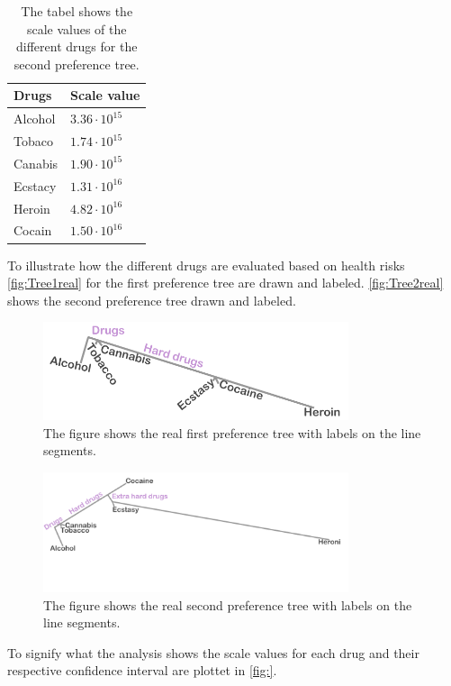 \begin{table}[H]
	\centering
	\begin{tabular}{@{}ll@{}}
		\toprule
		Drugs     & Scale value \\ \midrule
		Alcohol	  & $3.36\cdot10^{15}$   \\
		Tobaco	  & $1.74\cdot10^{15}$   \\
		Canabis	  & $1.90\cdot10^{15}$   \\
		Ecstacy	  & $1.31\cdot10^{16}$   \\
		Heroin	  & $4.82\cdot10^{16}$   \\
		Cocain	  & $1.50\cdot10^{16}$   \\	\bottomrule
	\end{tabular}
	\caption{The tabel shows the scale values of the different drugs for the second preference tree.}
	\label{tab:ScaleValues2}
\end{table} 
\noindent 
%
To illustrate how the different drugs are evaluated based on health risks \autoref{fig:Tree1real} for the first preference tree are drawn and labeled. \autoref{fig:Tree2real} shows the second preference tree drawn and labeled. 
%
\begin{figure}[H]
\centering
\includegraphics[width = 0.80\textwidth]{Figure/Tree1real}
\caption{The figure shows the real first preference tree with labels on the line segments.}
\label{fig:Tree1real}
\end{figure}
\noindent
%
\begin{figure}[H]
	\centering
	\includegraphics[width = 0.80\textwidth]{Figure/Tree2real}
	\caption{The figure shows the real second preference tree with labels on the line segments.}
	\label{fig:Tree2real}
\end{figure}
\noindent
%
To signify what the analysis shows the scale values for each drug and their respective confidence interval are plottet in \autoref{fig:}.


